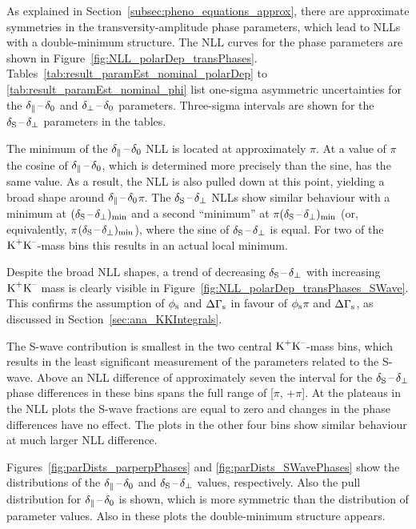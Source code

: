 As explained in Section~\ref{subsec:pheno_equations_approx}, there are approximate symmetries in the transversity-amplitude phase
parameters, which lead to NLLs with a double-minimum structure. The NLL curves for the phase parameters are shown in
Figure~\ref{fig:NLL_polarDep_transPhases}. Tables~\ref{tab:result_paramEst_nominal_polarDep} to \ref{tab:result_paramEst_nominal_phi} list
one-sigma asymmetric uncertainties for the $\delta_{\parallel}\,\text{--}\,\delta_{0}$ and $\delta_{\perp}\,\text{--}\,\delta_{0}$ parameters. Three-sigma intervals are shown for the $\delta_{\text{S}}\,\text{--}\,\delta_{\perp}$
parameters in the tables.

The minimum of the $\delta_{\parallel}\,\text{--}\,\delta_{0}$ NLL is located at approximately $\pi$. At a value of $\pi$ the cosine of
$\delta_{\parallel}\,\text{--}\,\delta_{0}$, which is determined more precisely than the sine, has the same value. As a result, the NLL is also pulled down at this
point, yielding a broad shape around $\delta_{\parallel}\,\text{--}\,\delta_{0}$\texteq$\pi$. The $\delta_{\text{S}}\,\text{--}\,\delta_{\perp}$ NLLs show similar behaviour with a minimum at
$(\delta_{\text{S}}\,\text{--}\,\delta_{\perp})_\text{min}$ and a second ``minimum'' at $\pi$\textminus$(\delta_{\text{S}}\,\text{--}\,\delta_{\perp})_\text{min}$ (or, equivalently,
\tm$\pi$\textminus$(\delta_{\text{S}}\,\text{--}\,\delta_{\perp})_\text{min}$), where the sine of $\delta_{\text{S}}\,\text{--}\,\delta_{\perp}$ is equal. For two of the $\text{K}^\text{+}\text{K}^\text{--}$-mass bins this results in an
actual local minimum.

Despite the broad NLL shapes, a trend of decreasing $\delta_{\text{S}}\,\text{--}\,\delta_{\perp}$ with increasing $\text{K}^\text{+}\text{K}^\text{--}$ mass is clearly visible in
Figure~\ref{fig:NLL_polarDep_transPhases_SWave}. This confirms the assumption of $\phi_\text{s}$ and $\Delta\Gamma_\text{s}$ in favour of
$\phi_\text{s}$\textapprox$\pi$ and $\Delta\Gamma_\text{s}$, as discussed in Section~\ref{sec:ana_KKIntegrals}.

The S-wave contribution is smallest in the two central $\text{K}^\text{+}\text{K}^\text{--}$-mass bins, which results in the least significant measurement of the
parameters related to the S-wave. Above an NLL difference of approximately seven the interval for the $\delta_{\text{S}}\,\text{--}\,\delta_{\perp}$ phase differences in
these bins spans the full range of [\tm$\pi$, +$\pi$]. At the plateaus in the NLL plots the S-wave fractions are equal to zero and changes
in the phase differences have no effect. The plots in the other four bins show similar behaviour at much larger NLL difference.

Figures~\ref{fig:parDists_parperpPhases} and \ref{fig:parDists_SWavePhases} show the distributions of the $\delta_{\parallel}\,\text{--}\,\delta_{0}$ and $\delta_{\text{S}}\,\text{--}\,\delta_{\perp}$
values, respectively. Also the pull distribution for $\delta_{\parallel}\,\text{--}\,\delta_{0}$ is shown, which is more symmetric than the distribution of parameter
values. Also in these plots the double-minimum structure appears.
